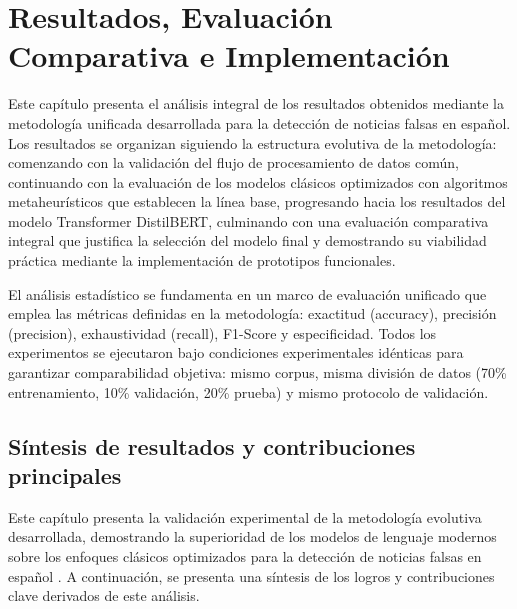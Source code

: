 \chapter{Resultados, Evaluación Comparativa e Implementación \label{cap:AnalisisDeResultados}}

Este capítulo presenta el análisis integral de los resultados obtenidos mediante la metodología unificada desarrollada para la detección de noticias falsas en español. Los resultados se organizan siguiendo la estructura evolutiva de la metodología: comenzando con la validación del flujo de procesamiento de datos común, continuando con la evaluación de los modelos clásicos optimizados con algoritmos metaheurísticos que establecen la línea base, progresando hacia los resultados del modelo Transformer DistilBERT, culminando con una evaluación comparativa integral que justifica la selección del modelo final y demostrando su viabilidad práctica mediante la implementación de prototipos funcionales.

El análisis estadístico se fundamenta en un marco de evaluación unificado que emplea las métricas definidas en la metodología: exactitud (accuracy), precisión (precision), exhaustividad (recall), F1-Score y especificidad. Todos los experimentos se ejecutaron bajo condiciones experimentales idénticas para garantizar comparabilidad objetiva: mismo corpus, misma división de datos (70\% entrenamiento, 10\% validación, 20\% prueba) y mismo protocolo de validación.

\newpage

\section{Síntesis de resultados y contribuciones principales}
\label{sec:sintesis_resultados_principales}

Este capítulo presenta la validación experimental de la metodología evolutiva desarrollada, demostrando la superioridad de los modelos de lenguaje modernos sobre los enfoques clásicos optimizados para la detección de noticias falsas en español \cite{blanco2024enhancing, hurtado2024calibracion}. A continuación, se presenta una síntesis de los logros y contribuciones clave derivados de este análisis.

